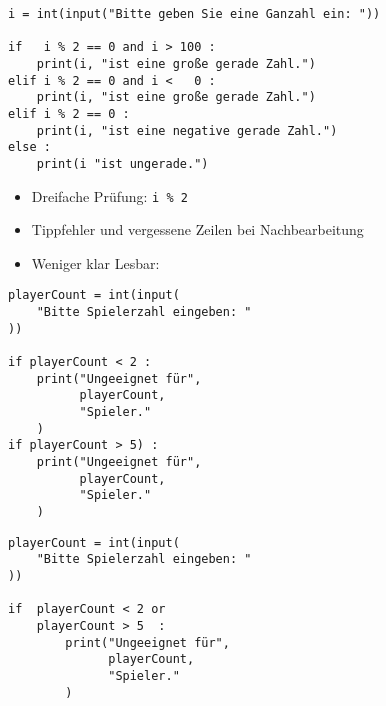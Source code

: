 \begin{frame}[fragile]
%
\begin{warnbox}[Redundanz bei \texttt{if} mit logischen Operatoren: \texttt{elif}, leftupper=6mm]
\begin{verbatim}
i = int(input("Bitte geben Sie eine Ganzahl ein: "))

if   i % 2 == 0 and i > 100 :
    print(i, "ist eine große gerade Zahl.")
elif i % 2 == 0 and i <   0 :
    print(i, "ist eine große gerade Zahl.")
elif i % 2 == 0 :
    print(i, "ist eine negative gerade Zahl.")
else :
    print(i "ist ungerade.")
\end{verbatim}
\end{warnbox}
%
\begin{itemize}
\item Dreifache Prüfung: \texttt{i \% 2}
\item Tippfehler und vergessene Zeilen bei Nachbearbeitung
\item Weniger klar Lesbar: 
\end{itemize}
%
\end{frame}


\begin{frame}[fragile]
%
\begin{tcbraster}[raster columns=2,
                  raster equal height,
                  nobeforeafter,
                  raster column skip=0.5cm]
	\begin{warnbox}[Gültigkeitsprüfung: Reihe von \texttt{if}s, leftupper=7mm]
	\begin{verbatim}
playerCount = int(input(
    "Bitte Spielerzahl eingeben: "
))
      
if playerCount < 2 :
    print("Ungeeignet für", 
          playerCount, 
          "Spieler."
    )
if playerCount > 5) :
    print("Ungeeignet für", 
          playerCount,
          "Spieler."
    )
	\end{verbatim}
	\end{warnbox}
%
	\begin{codebox}
	\begin{verbatim}
playerCount = int(input(
    "Bitte Spielerzahl eingeben: "
))
      
if  playerCount < 2 or
    playerCount > 5  :
        print("Ungeeignet für",
              playerCount,
              "Spieler."
        )
	\end{verbatim}
	\end{codebox}
\end{tcbraster}
%
\end{frame}

